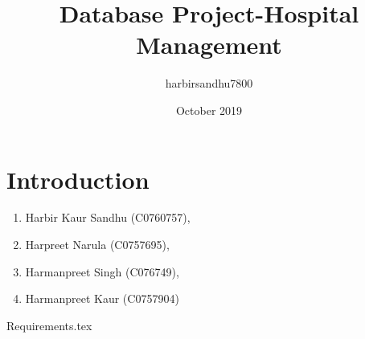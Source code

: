 \documentclass{article}
\title{Database Project-Hospital Management}
\author{harbirsandhu7800 }
\date{October 2019}
\begin{document}
\maketitle
\tableofcontents

\section{Introduction}
\begin{enumerate}
    \item Harbir Kaur Sandhu (C0760757),
    \item Harpreet Narula (C0757695),    
    \item Harmanpreet Singh (C076749),    
    \item Harmanpreet Kaur (C0757904)    
\end{enumerate}

 {Requirements.tex}
\end{document}

